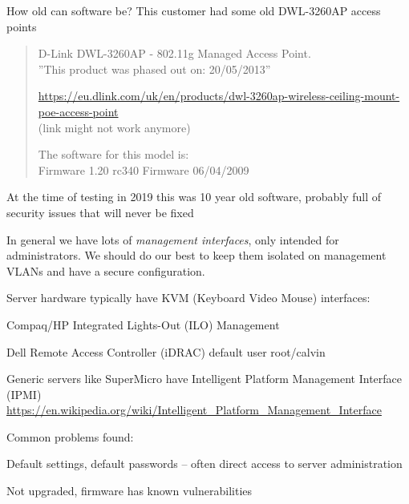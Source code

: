 \documentclass[Screen16to9,17pt]{foils}
\begin{document}


How old can software be? This customer had some old DWL-3260AP access points

\begin{quote}
D-Link DWL-3260AP - 802.11g Managed Access Point.\\
”This product was phased out on: 20/05/2013”

\url{https://eu.dlink.com/uk/en/products/dwl-3260ap-wireless-ceiling-mount-poe-access-point}\\
 (link might not work anymore)

The software for this model is:\\
Firmware 1.20 rc340 Firmware 06/04/2009
\end{quote}

\vskip 2cm
\begin{list2}
\item At the time of testing in 2019 this was 10 year old software, probably full of security issues that will never be fixed
\end{list2}



In general we have lots of \emph{management interfaces}, only intended for administrators. We should do our best to keep them isolated on management VLANs and have a secure configuration.

Server hardware typically have KVM (Keyboard Video Mouse) interfaces:
\begin{list2}
\item Compaq/HP Integrated Lights-Out (ILO) Management
\item Dell Remote Access Controller (iDRAC) default user root/calvin
\item Generic servers like SuperMicro have Intelligent Platform Management Interface (IPMI)\\
\url{https://en.wikipedia.org/wiki/Intelligent_Platform_Management_Interface}
\end{list2}

Common problems found:
\begin{list2}
\item Default settings, default passwords -- often direct access to server administration
\item Not upgraded, firmware has known vulnerabilities
\end{list2}
\end{document}
